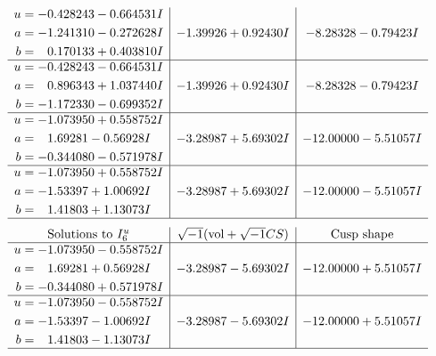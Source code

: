 \documentclass[1p]{elsarticle_modified}
\theoremstyle{definition}
\newcommand{\I}{\sqrt{-1}}
\begin{document}
$$\begin{array}{c|c|c}
\begin{aligned}
u &= -0.428243 - 0.664531 I \\
a &= -1.241310 - 0.272628 I \\
b &= \phantom{-}0.170133 + 0.403810 I\end{aligned}
 & -1.39926 + 0.92430 I & -8.28328 - 0.79423 I \\ \hline\begin{aligned}
u &= -0.428243 - 0.664531 I \\
a &= \phantom{-}0.896343 + 1.037440 I \\
b &= -1.172330 - 0.699352 I\end{aligned}
 & -1.39926 + 0.92430 I & -8.28328 - 0.79423 I \\ \hline\begin{aligned}
u &= -1.073950 + 0.558752 I \\
a &= \phantom{-}1.69281 - 0.56928 I \\
b &= -0.344080 - 0.571978 I\end{aligned}
 & -3.28987 + 5.69302 I & -12.00000 - 5.51057 I \\ \hline\begin{aligned}
u &= -1.073950 + 0.558752 I \\
a &= -1.53397 + 1.00692 I \\
b &= \phantom{-}1.41803 + 1.13073 I\end{aligned}
 & -3.28987 + 5.69302 I & -12.00000 - 5.51057 I\\
 \hline 
 \end{array}$$\newpage$$\begin{array}{c|c|c}  
\text{Solutions to }I^u_{6}& \I (\text{vol} + \sqrt{-1}CS) & \text{Cusp shape}\\
 \hline 
\begin{aligned}
u &= -1.073950 - 0.558752 I \\
a &= \phantom{-}1.69281 + 0.56928 I \\
b &= -0.344080 + 0.571978 I\end{aligned}
 & -3.28987 - 5.69302 I & -12.00000 + 5.51057 I \\ \hline\begin{aligned}
u &= -1.073950 - 0.558752 I \\
a &= -1.53397 - 1.00692 I \\
b &= \phantom{-}1.41803 - 1.13073 I\end{aligned}
 & -3.28987 - 5.69302 I & -12.00000 + 5.51057 I\\
 \hline 
 \end{array}$$\newpage\newpage\renewcommand{\arraystretch}{1}
\end{document}
